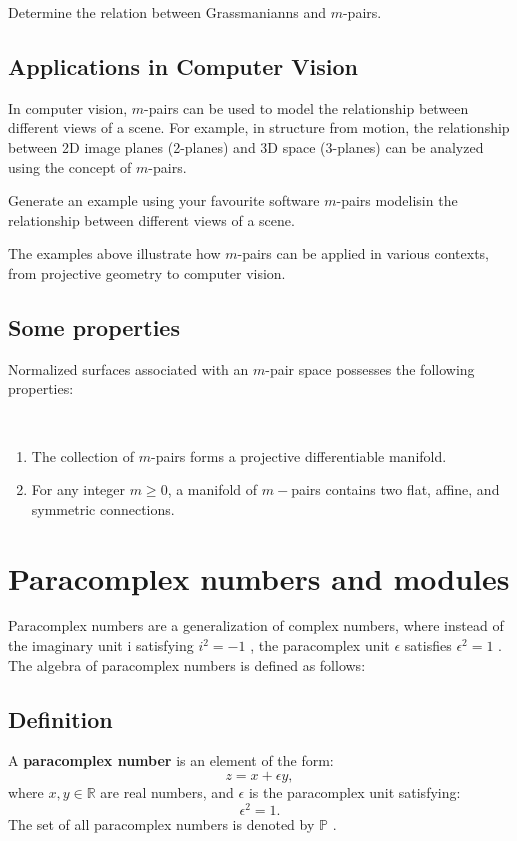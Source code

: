 \begin{ex}
Determine the relation between Grassmanianns and $m$-pairs. 
\end{ex}
\subsection*{Applications in Computer Vision}
In computer vision, $m$-pairs can be used to model the relationship between different views of a scene. For example, in structure from motion, the relationship between 2D image planes (2-planes) and 3D space (3-planes) can be analyzed using the concept of $m $-pairs.

\begin{ex}
Generate an example using your favourite software $m$-pairs modelisin the relationship between different views of a scene.
\end{ex}

 The examples above illustrate how $m $-pairs can be applied in various contexts, from projective geometry to computer vision.\,


\subsection{Some properties}

Normalized surfaces associated with an $m$-pair space possesses the following properties:
\medskip
\begin{lemma}\label{L:pairs}
\
\begin{enumerate}
\item The collection of $m$-pairs forms a projective differentiable manifold.
\item For any integer $m \geq 0$, a manifold of $m-$pairs contains two flat, affine, and symmetric connections.
\end{enumerate}
\end{lemma}

\section{Paracomplex numbers and modules}
Paracomplex numbers are a generalization of complex numbers, where instead of the imaginary unit   i    satisfying  $ i^2 = -1 $  , the paracomplex unit   $\epsilon $   satisfies  $ \epsilon^2 = 1 $  . The algebra of paracomplex numbers is defined as follows:

\subsection{Definition}
A \textbf{paracomplex number} is an element of the form:
\[
z = x + \epsilon y,
\]
where  $ x, y \in \mathbb{R} $   are real numbers, and  $ \epsilon  $   is the paracomplex unit satisfying:
\[
\epsilon ^2 = 1.
\]
The set of all paracomplex numbers is denoted by   $\mathbb{P}$   .

